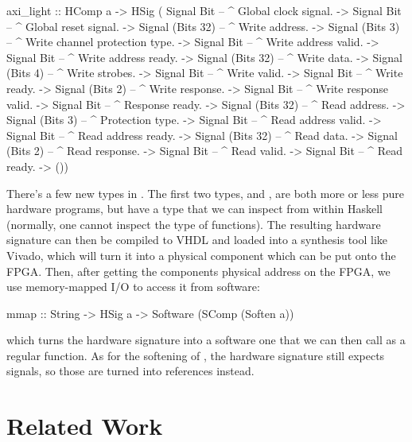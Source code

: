 \begin{code}
axi_light :: HComp a -> HSig (
     Signal Bit       -- ^ Global clock signal.
  -> Signal Bit       -- ^ Global reset signal.
  -> Signal (Bits 32) -- ^ Write address.
  -> Signal (Bits 3)  -- ^ Write channel protection type.
  -> Signal Bit       -- ^ Write address valid.
  -> Signal Bit       -- ^ Write address ready.
  -> Signal (Bits 32) -- ^ Write data.
  -> Signal (Bits 4)  -- ^ Write strobes.
  -> Signal Bit       -- ^ Write valid.
  -> Signal Bit       -- ^ Write ready.
  -> Signal (Bits 2)  -- ^ Write response.
  -> Signal Bit       -- ^ Write response valid.
  -> Signal Bit       -- ^ Response ready.
  -> Signal (Bits 32) -- ^ Read address.
  -> Signal (Bits 3)  -- ^ Protection type.
  -> Signal Bit       -- ^ Read address valid.
  -> Signal Bit       -- ^ Read address ready.
  -> Signal (Bits 32) -- ^ Read data.
  -> Signal (Bits 2)  -- ^ Read response.
  -> Signal Bit       -- ^ Read valid.
  -> Signal Bit       -- ^ Read ready.    
  -> ())
\end{code}

There's a few new types in . The first two types,  and , are both more or less pure hardware programs, but have a type that we can inspect from within Haskell (normally, one cannot inspect the type of functions). The resulting hardware signature can then be compiled to VHDL and loaded into a synthesis tool like Vivado, which will turn it into a physical component which can be put onto the FPGA. Then, after getting the components physical address on the FPGA, we use memory-mapped I/O to access it from software:

\begin{code}
mmap :: String -> HSig a -> Software (SComp (Soften a))
\end{code}

\noindent which turns the hardware signature into a software one that we can then call as a regular function. As for the softening of , the hardware signature still expects signals, so those are turned into references instead.

%
%

\section{Related Work}
\label{related}

